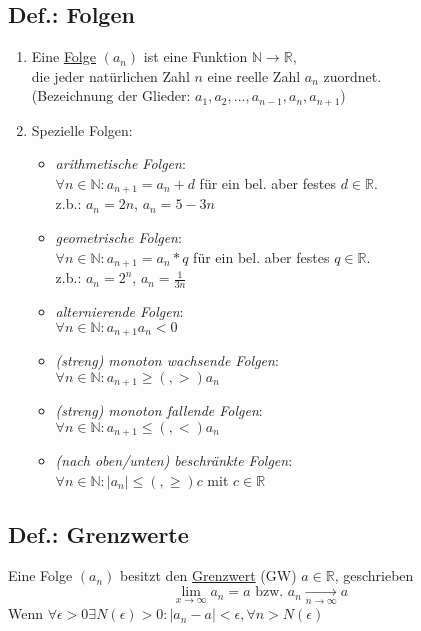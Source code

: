 \documentclass[a4paper,11pt]{article}
\begin{document}
\subsection{Def.: Folgen}
\begin{enumerate}[label={\alph*)}]
	\item Eine \underline{Folge} $(a_n)$ ist eine Funktion $\mathbb{N}\rightarrow\mathbb{R}$,\\
		die jeder natürlichen Zahl $n$ eine reelle Zahl $a_n$ zuordnet.\\
		(Bezeichnung der Glieder: $a_1,a_2,...,a_{n-1},a_n,a_{n+1}$)
	\item Spezielle Folgen:
		\begin{itemize}
			\item \emph{arithmetische Folgen}:\\
				$\forall n\in \mathbb{N}:a_{n+1}=a_n+d$ für ein bel. aber festes $d\in\mathbb{R}$.\\
				z.b.: $a_n=2n$, $a_n=5-3n$
			\item \emph{geometrische Folgen}:\\
				$\forall n\in \mathbb{N}:a_{n+1}=a_n*q$ für ein bel. aber festes $q\in\mathbb{R}$.\\
				z.b.: $a_n=2^n$, $a_n=\frac{1}{3n}$
			\item \emph{alternierende Folgen}:\\
				$\forall n\in\mathbb{N}:a_{n+1}a_n<0$
			\item \emph{(streng) monoton wachsende Folgen}:\\
				$\forall n\in\mathbb{N}:a_{n+1}\geq(,>)a_n$
			\item \emph{(streng) monoton fallende Folgen}:\\
				$\forall n\in\mathbb{N}:a_{n+1}\leq(,<)a_n$
			\item \emph{(nach oben/unten) beschränkte Folgen}:\\
				$\forall n\in\mathbb{N}:|a_n|\leq(,\geq) c$ mit $c\in\mathbb{R}$
		\end{itemize}
\end{enumerate}
\subsection{Def.: Grenzwerte}
	Eine Folge $(a_n)$ besitzt den \underline{Grenzwert} (GW) $a\in\mathbb{R}$, geschrieben
	\[\lim_{x\to\infty}a_n=a \text{ bzw. } a_n\underset{{n\to\infty}}{\to}a\]
	Wenn $\forall \epsilon>0\exists N(\epsilon)>0:|a_n-a|<\epsilon, \forall n>N(\epsilon)$
\end{document}
